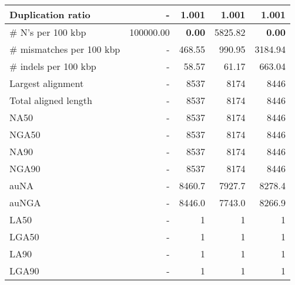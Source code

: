\documentclass[12pt,a4paper]{article}
\begin{document}
\begin{table}[ht]
\begin{center}
\begin{tabular}{|l*{4}{|r}|}
Duplication ratio & - & 1.001 & 1.001 & 1.001 \\ \hline
\# N's per 100 kbp & 100000.00 & {\bf 0.00} & 5825.82 & {\bf 0.00} \\ \hline
\# mismatches per 100 kbp & - & 468.55 & 990.95 & 3184.94 \\ \hline
\# indels per 100 kbp & - & 58.57 & 61.17 & 663.04 \\ \hline
Largest alignment & - & 8537 & 8174 & 8446 \\ \hline
Total aligned length & - & 8537 & 8174 & 8446 \\ \hline
NA50 & - & 8537 & 8174 & 8446 \\ \hline
NGA50 & - & 8537 & 8174 & 8446 \\ \hline
NA90 & - & 8537 & 8174 & 8446 \\ \hline
NGA90 & - & 8537 & 8174 & 8446 \\ \hline
auNA & - & 8460.7 & 7927.7 & 8278.4 \\ \hline
auNGA & - & 8446.0 & 7743.0 & 8266.9 \\ \hline
LA50 & - & 1 & 1 & 1 \\ \hline
LGA50 & - & 1 & 1 & 1 \\ \hline
LA90 & - & 1 & 1 & 1 \\ \hline
LGA90 & - & 1 & 1 & 1 \\ \hline
\end{tabular}
\end{center}
\end{table}
\end{document}
